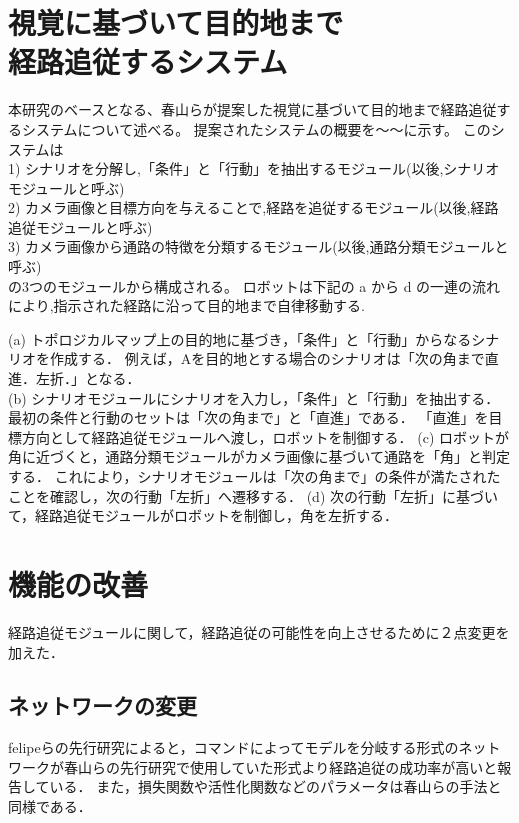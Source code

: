 \documentclass[10pt]{jarticle}
\begin{document}
    \section{視覚に基づいて目的地まで\\経路追従するシステム}
    本研究のベースとなる、春山らが提案した視覚に基づいて目的地まで経路追従するシステムについて述べる。
    提案されたシステムの概要を～～に示す。
    このシステムは \\
    1) シナリオを分解し,「条件」と「行動」を抽出するモジュール(以後,シナリオモジュールと呼ぶ) \\
    2) カメラ画像と目標方向を与えることで,経路を追従するモジュール(以後,経路追従モジュールと呼ぶ) \\
    3) カメラ画像から通路の特徴を分類するモジュール(以後,通路分類モジュールと呼ぶ) \\
    の3つのモジュールから構成される。
    ロボットは下記の a から d の一連の流れにより,指示された経路に沿って目的地まで自律移動する.


    (a) トポロジカルマップ上の目的地に基づき，「条件」と「行動」からなるシナリオを作成する．
        例えば，Aを目的地とする場合のシナリオは「次の角まで直進．左折．」となる．\\
    (b) シナリオモジュールにシナリオを入力し，「条件」と「行動」を抽出する．
        最初の条件と行動のセットは「次の角まで」と「直進」である．
        「直進」を目標方向として経路追従モジュールへ渡し，ロボットを制御する．
    (c) ロボットが角に近づくと，通路分類モジュールがカメラ画像に基づいて通路を「角」と判定する．
        これにより，シナリオモジュールは「次の角まで」の条件が満たされたことを確認し，次の行動「左折」へ遷移する．
    (d) 次の行動「左折」に基づいて，経路追従モジュールがロボットを制御し，角を左折する．
    
    \section{機能の改善}%
    経路追従モジュールに関して，経路追従の可能性を向上させるために２点変更を加えた．
    \subsection{ネットワークの変更}
    felipeらの先行研究\cite{Codevilla2018}によると，コマンドによってモデルを分岐する形式のネットワークが春山らの先行研究で使用していた形式より経路追従の成功率が高いと報告している．
    また，損失関数や活性化関数などのパラメータは春山らの手法と同様である．
\end{document}
